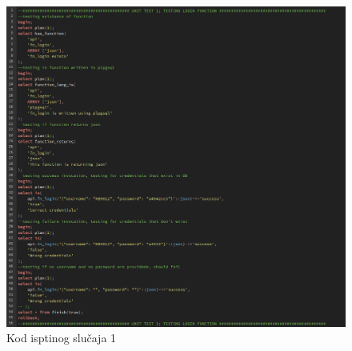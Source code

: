 				\begin{figure}[H]
					\centering
					\includegraphics[width=\textwidth]{slike/unit_tests/ut_1/code.png}
					\caption{Kod isptinog slučaja 1}
					\label{fig: IS1-kod}
				\end{figure}
				\eject
